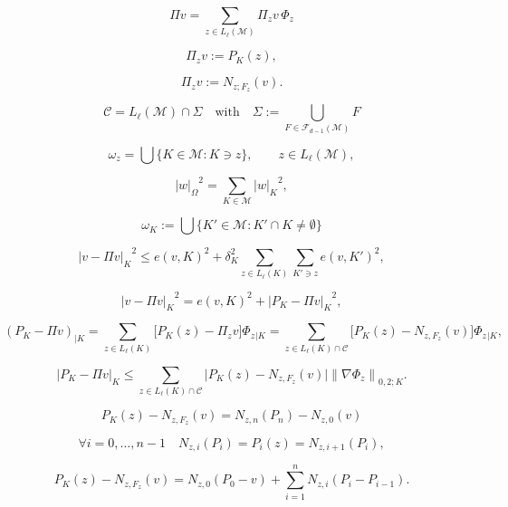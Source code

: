 \documentclass[a4paper]{article}
\begin{document}
\[
 \Pi v
 =
 \sum_{z\in{L_{{\ell}}}({\mathcal{M}})} {\Pi}_z v \, {\Phi}_z
\]

\begin{equation}
\label{DefIp:unconstrained}
 {\Pi}_z v {:=} P_{K}(z),
\end{equation}

\begin{equation}
\label{DefIp:constrained}
 {\Pi}_z v
 {:=}
 {N}_{z;F_z}(v).
\end{equation}

\[
 {\mathcal{C}} = {L_{{\ell}}}({\mathcal{M}}) \cap {\Sigma}
\quad\text{with}\quad
 {\Sigma}
 {:=}
 \bigcup_{{F}\in{\mathcal{F}_{d-1}}({\mathcal{M}})} {F}
\]

\[
 \omega_z = \bigcup\{{K}\in{\mathcal{M}} : {K}\ni z\},
\qquad
 z\in{L_{{\ell}}}({\mathcal{M}}),
\]

\[
 {\left|{w}\right|_{{\Omega}}}^2
 =
 \sum_{{K}\in{\mathcal{M}}}{\left|{w}\right|_{K}}^2,
\]

\[
 \omega_{K}
 {:=}
 \bigcup \{{K}'\in{\mathcal{M}}:{K}'\cap{K}\neq\emptyset\}
\]

\begin{equation}
\label{LDcplng}
 {\left|{v - {\Pi} v}\right|_{K}}^2
 \leq
 e(v,{K})^2 
 +
 {\delta}_{K}^2
 \sum_{z\in{L_{{\ell}}}({K})} \sum_{{K}'\ni z} e(v,{K}')^2,
\end{equation}

\[
 {\left|{v - {\Pi} v}\right|_{K}}^2
 =
 e(v,{K})^2 
 +
 {\left|{P_{K} - {\Pi} v}\right|_{K}}^2,
\]

\[
 (P_{K} - {\Pi} v)_{|{K}}
 =
 \sum_{z\in{L_{{\ell}}}({K})}
  \big[ P_{K}(z) - {\Pi}_z v \big] {\Phi}_z{}_{|{K}}
 =
 \sum_{z\in{L_{{\ell}}}({K})\cap{\mathcal{C}}}
  \big[ P_{K}(z) - {N}_{z,{F}_z}(v) \big] {\Phi}_z{}_{|{K}},
\]

\begin{equation}
\label{CplngErr}
 {\left|{P_{K} - {\Pi} v}\right|_{K}}
 \leq
  \sum_{z\in{L_{{\ell}}}({K})\cap{\mathcal{C}}}
  \big| P_{K}(z) - {N}_{z,{F}_z}(v) \big|
   {{\left\|{{{\nabla}{\Phi}_z}}\right\|_{{0,2;{K}}}}}.
\end{equation}

\[
 P_{K}(z)-{N}_{z,{F}_z}(v)
 =
 {N}_{z,n}(P_n)-{N}_{z,0}(v)
\]

\[
 \forall i=0,\dots,n-1
\quad
 {N}_{z,i}(P_i)
 =
 P_i(z)
 =
 {N}_{z,i+1}(P_i),
\]

\begin{equation}
\label{Telescopic}
 P_{K}(z)-{N}_{z,{F}_z}(v)
 =
 {N}_{z,0}(P_0-v)
 +
 \sum_{i=1}^n {N}_{z,i}(P_i-P_{i-1}).
\end{equation}
\end{document}
